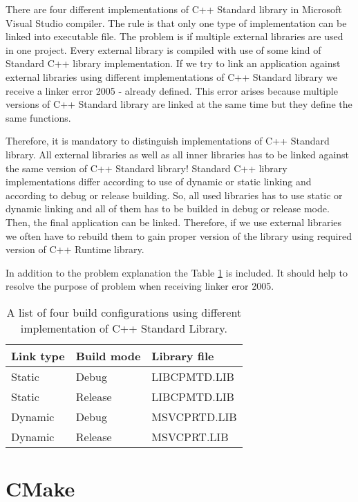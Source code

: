 There are four different implementations of C++ Standard library in Microsoft Visual Studio compiler. The rule is that only one type of implementation can be linked into executable file. The problem is if multiple external libraries are used in one project. Every external library is compiled with use of some kind of Standard C++ library implementation. If we try to link an application against external libraries using different implementations of C++ Standard library we receive a linker error 2005 - already defined. This error arises because multiple versions of C++ Standard library are linked at the same time but they define the same functions.

Therefore, it is mandatory to distinguish implementations of C++ Standard library. All external libraries as well as all inner libraries has to be linked against the same version of C++ Standard library! Standard C++ library implementations differ according to use of dynamic or static linking and according to debug or release building. So, all used libraries has to use static or dynamic linking and all of them has to be builded in debug or release mode. Then, the final application can be linked. Therefore, if we use external libraries we often have to rebuild them to gain proper version of the library using required version of C++ Runtime library.

In addition to the problem explanation the Table \ref{standardlibrarytable} is included. It should help to resolve the purpose of problem when receiving linker eror 2005. 

\begin{table}
  \caption{A list of four build configurations using different implementation of C++ Standard Library.}
  \label{standardlibrarytable}
	\begin{tabular}{| l| l | l |}
	  \hline                       
	  Link type & Build mode & Library file \\
	  \hline
	  \hline                     
	  Static & Debug & LIBCPMTD.LIB\\
	  \hline
	  Static & Release & LIBCPMTD.LIB\\
	  \hline  
	  Dynamic & Debug & MSVCPRTD.LIB\\
	  \hline  
	  Dynamic & Release & MSVCPRT.LIB\\  
	  \hline  
	\end{tabular}
\end{table}


\section{CMake}


